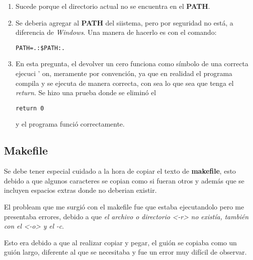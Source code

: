 \documentclass{article}
\begin{document}
\begin{enumerate}
\item Sucede porque el directorio actual no se encuentra en el \textbf{PATH}.
\item Se deberia agregar al \textbf{PATH} del siistema, pero por seguridad no est\' a, a diferencia de \textit{Windows}. Una manera de hacerlo es con el comando: 
\begin{verbatim}
PATH=.:$PATH:.
\end{verbatim}
\item En esta pregunta, el devolver un cero funciona como s\' imbolo de una correcta ejecuci
' on, meramente por convenci\' on, ya que en realidad el programa compila y se ejecuta de manera correcta, con sea lo que sea que tenga el \textit{return}. Se hizo una prueba donde se elimin\' o el \begin{verbatim}
return 0
\end{verbatim}
y el programa funci\' o correctamente.
\end{enumerate}

\subsection*{Makefile}

Se debe tener especial cuidado a la hora de copiar el texto de \textbf{makefile}, esto debido a que algunos caracteres se copian como si fueran otros y adem\' as que se incluyen espacios extras donde no deberian existir.

\bigskip

El probleam que me surgi\' o con el makefile fue que estaba ejecutandolo pero me presentaba errores, debido a que \textit{ el archivo o directorio <-r> no exist\' ia, tambi\' en con el <-o> y el -c}.

Esto era debido a que al realizar copiar y pegar, el gui\' on se copiaba como un gui\' on largo, diferente al que se necesitaba y fue un error muy dif\' icil de observar.
\end{document}
